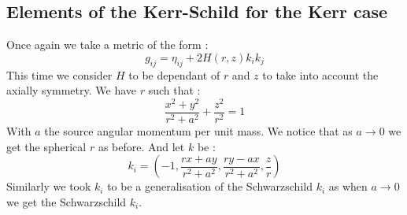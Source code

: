 \documentclass[a4paper,12pt]{article}
\theoremstyle{definition}
\begin{document}
\subsection{Elements of the Kerr-Schild for the Kerr case}
Once again we take a metric of the form :
\begin{equation}
	g_{ij}=\eta_{ij}+2H(r,z)k_ik_j
\end{equation}
This time we consider $H$ to be dependant of $r$ and $z$ to take into account the axially symmetry.
We have $r$ such that :
\begin{equation}
	\frac{x^2+y^2}{r^2+a^2}+\frac{z^2}{r^2}=1
\end{equation}
With $a$ the source angular momentum per unit mass.
We notice that as $a \rightarrow 0$ we get the spherical $r$ as before.
And let $k$ be :
\begin{equation}
	k_i=(-1,\frac{r x + a y}{r^2 + a^2},\frac{ry-ax}{r^2+a^2},\frac{z}{r})
\end{equation}
Similarly we took $k_i$ to be a generalisation of the Schwarzschild $k_i$ as when $a \rightarrow 0$ we get the Schwarzschild $k_i$.
\end{document}
